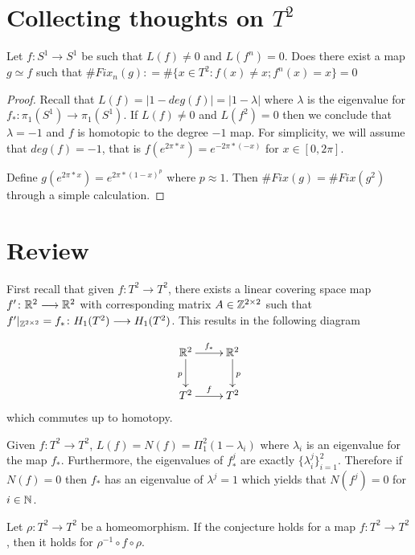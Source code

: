 \documentclass[11pt,oneside,draft]{amsart}
\numberwithin{equation}{section} %
\numberwithin{figure}{section} %
\begin{document}
 \section*{{\bf Collecting thoughts on \texorpdfstring{$T^2$}{T}}}
\vskip 1cm

\begin{eg}Let $f  \colon  S^1\rightarrow S^1$ be such that $L(f)\not =0$ and $L(f^n)=0$. Does there exist a map $g\simeq f $ such that $\#Fix_n (g) \colon = \# \{ x\in T^2 \colon f(x)\not = x ; f^n(x)=x\}=0$
\end{eg}

\begin{proof}
Recall that $L(f)=|1-deg(f)|=|1-\lambda|$ where $\lambda$ is the eigenvalue for $f_*\colon\pi_1(S^1)\rightarrow \pi_1(S^1) $. 
If $L(f)\not = 0$ and $L(f^2)=0$ then we conclude that $\lambda=-1$ 
and $f$ is homotopic to the degree $-1$ map. 
For simplicity, we will assume that $deg(f)=-1$, that is 
$f(e^{2\pi*x})=e^{-2\pi*(-x)}$ for $x \in [0,2\pi ]$. 

Define $g(e^{2\pi*x})=e^{2\pi*(1-x)^p}$ where $p\approx 1$. Then $\#Fix(g)=\#Fix(g^2)$ through a simple calculation. 
\end{proof}


\section*{Review} 
First recall that given $f\colon T^2 \longrightarrow T^2$, there exists a 
linear covering space map $f'  \colon \mathbb{R}^2 \longrightarrow \mathbb{R}^2$ with 
corresponding matrix $A\in \mathbb{Z}^{2\times 2}$ such that $f'|_{\mathbb{Z}^{2\times 2}}=f_* \colon H _1 (T^2) \longrightarrow H_1(T^2)$. This results in the 
following diagram 

    $$\xymatrix{
	{\R^2 \ar[r]^{f_*} \ar[d]_p } &   {\R^2 \ar[d]^p } \\
						 T^2 \ar[r]^f & T^2
	}
	$$
which commutes up to homotopy. 

\begin{prop} \cite{MR0375287}   
	Given $f\colon T^2 \longrightarrow T^2$, $L(f)=N(f)= \Pi_1 ^2 (1-\lambda_i)$ where $\lambda_i$ is an eigenvalue for the map $f_*$. 
    Furthermore, the eigenvalues of $f_* ^j$ are exactly $\{\lambda_i ^j \}_{i=1}^2$. Therefore if $N(f)=0$ then $f_*$ has an eigenvalue of $\lambda^j=1$ which yields that $N(f^j)=0$ for $i\in \mathbb{N}$. 
\end{prop}

\begin{lem}\label{conjugation}\cite{MR1340261} 
	Let $\rho \colon T^2\longrightarrow T^2$ be a homeomorphism. If the 
conjecture holds for a map $f \colon T^2\longrightarrow T^2$, then it holds for $\rho^{-1}\circ f\circ \rho$. 
\end{lem}
\end{document}
